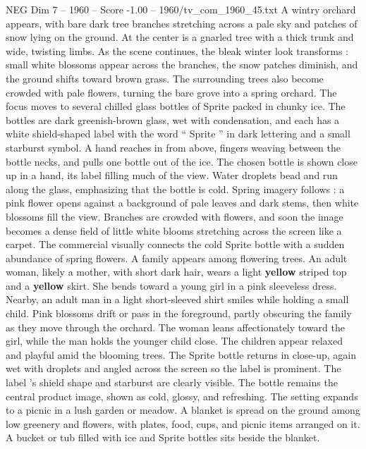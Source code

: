 \begin{textsample}{NEG Dim 7 – 1960 – Score -1.00 – 1960/tv\_com\_1960\_45.txt}  \label{ex:f7_neg_072}
A wintry orchard appears, with bare dark tree branches stretching across a pale sky and patches of snow lying on the ground.
At the center is a gnarled tree with a thick trunk and wide, twisting limbs.
As the scene continues, the bleak winter look transforms : small white blossoms appear across the branches, the snow patches diminish, and the ground shifts toward brown grass.
The surrounding trees also become crowded with pale flowers, turning the bare grove into a spring orchard.
The focus moves to several chilled glass bottles of Sprite packed in chunky ice.
The bottles are dark greenish-brown glass, wet with condensation, and each has a white shield-shaped label with the word “ Sprite ” in dark lettering and a small starburst symbol.
A hand reaches in from above, fingers weaving between the bottle necks, and pulls one bottle out of the ice.
The chosen bottle is shown close up in a hand, its label filling much of the view.
Water droplets bead and run along the glass, emphasizing that the bottle is cold.
Spring imagery follows : a pink flower opens against a background of pale leaves and dark stems, then white blossoms fill the view.
Branches are crowded with flowers, and soon the image becomes a dense field of little white blooms stretching across the screen like a carpet.
The commercial visually connects the cold Sprite bottle with a sudden abundance of spring flowers.
A family appears among flowering trees.
An adult woman, likely a mother, with short dark hair, wears a light \textbf{yellow} striped top and a \textbf{yellow} skirt.
She bends toward a young girl in a pink sleeveless dress.
Nearby, an adult man in a light short-sleeved shirt smiles while holding a small child.
Pink blossoms drift or pass in the foreground, partly obscuring the family as they move through the orchard.
The woman leans affectionately toward the girl, while the man holds the younger child close.
The children appear relaxed and playful amid the blooming trees.
The Sprite bottle returns in close-up, again wet with droplets and angled across the screen so the label is prominent.
The label ’s shield shape and starburst are clearly visible.
The bottle remains the central product image, shown as cold, glossy, and refreshing.
The setting expands to a picnic in a lush garden or meadow.
A blanket is spread on the ground among low greenery and flowers, with plates, food, cups, and picnic items arranged on it.
A bucket or tub filled with ice and Sprite bottles sits beside the blanket.

\end{textsample}
